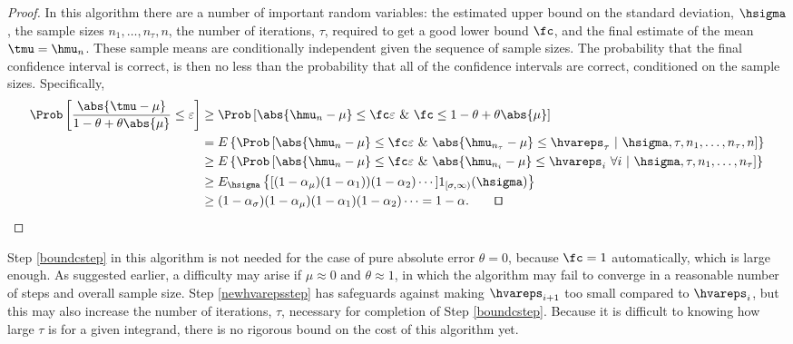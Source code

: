 \documentclass[graybox]{svmult}
\begin{document}
\begin{proof} In this algorithm there are a number of important random variables:  the estimated upper bound on the standard deviation, $\hsigma$, the sample sizes $n_1, \ldots, n_\tau, n$, the number of iterations, $\tau$, required to get a good  lower bound $\fc$, and the final estimate of the mean $\tmu=\hmu_n$. These sample means are conditionally independent given the sequence of sample sizes.  The probability that the final confidence interval is correct, is then no less than the probability that all of the confidence intervals are correct, conditioned on the sample sizes.  Specifically,
\begin{align*}
\Prob\left[\frac{\abs{\tmu-\mu}} {1-\theta + \theta\abs{\mu}} \le \varepsilon \right] & 
\ge \Prob\left[\abs{\hmu_{n}-\mu} \le \fc \varepsilon \ \& \ \fc\le 1-\theta + \theta\abs{\mu} \right] \\
& = E \left\{\Prob\left[\abs{\hmu_{n}-\mu} \le \fc \varepsilon \ \& \ \abs{\hmu_{n_{\tau}}-\mu} \le \hvareps_\tau \ | \ \hsigma, \tau, n_1, \ldots, n_{\tau},n \right] \right\} \\
& \ge E \left\{\Prob\left[\abs{\hmu_{n}-\mu} \le \fc \varepsilon \ \& \ \abs{\hmu_{n_{i}}-\mu} \le \hvareps_i \ \forall i \ | \ \hsigma, \tau, n_1, \ldots, n_{\tau} \right] \right\} \\
& \ge E_{\hsigma} \left\{[(1-\alpha_\mu)(1-\alpha_1) )(1-\alpha_2) \cdots ] 1_{[\sigma,\infty)}(\hsigma) \right\}\\
& \ge (1-\alpha_{\sigma}) (1-\alpha_\mu) (1-\alpha_1)(1-\alpha_2) \cdots = 1-\alpha. \qquad \qed
\end{align*}
\end{proof}

\begin{remark} Step \ref{boundcstep} in this algorithm is not needed for the case of pure absolute error $\theta=0$, because $\fc=1$ automatically, which is large enough.  As suggested earlier, a difficulty may arise if $\mu \approx 0$ and $\theta \approx 1$, in which the algorithm may fail to converge in a reasonable number of steps and overall sample size.  Step \ref{newhvarepsstep} has safeguards against making $\hvareps_{i+1}$ too small compared to $\hvareps_{i}$, but this may also increase the number of iterations, $\tau$, necessary for completion of Step \ref{boundcstep}.  Because it is difficult to knowing how large $\tau$ is for a given integrand, there is no rigorous bound on the cost of this algorithm yet.
\end{remark}
\end{document}
